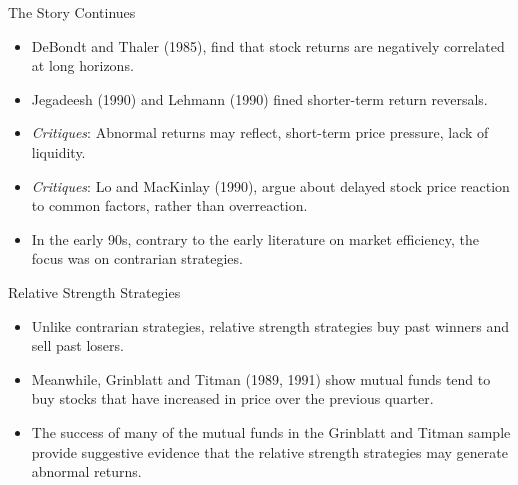 \documentclass{beamer}
\begin{document}
\begin{frame}{The Story Continues}
    \begin{itemize}
        \item DeBondt and Thaler (1985), find that stock returns are negatively correlated at long horizons.
        \item Jegadeesh (1990) and Lehmann (1990) fined shorter-term return reversals.
        \item \textit{Critiques}: Abnormal returns may reflect, short-term price pressure, lack of liquidity.
        \item \textit{Critiques}: Lo and MacKinlay (1990), argue about delayed stock price reaction to common factors, rather than overreaction.
        \item In the early 90s, contrary to the early literature on market efficiency, the focus was on contrarian strategies.
    \end{itemize}
\end{frame}

\begin{frame}{Relative Strength Strategies}
    \begin{itemize}
        \item Unlike contrarian strategies, relative strength strategies buy past winners and sell past losers.
        \item Meanwhile, Grinblatt and Titman (1989, 1991) show mutual funds tend to buy stocks that have increased in price over the previous quarter.
        \item The success of many of the mutual funds in the Grinblatt and Titman sample provide suggestive evidence that the relative strength strategies may generate abnormal returns.
    \end{itemize}
\end{frame}
\end{document}
